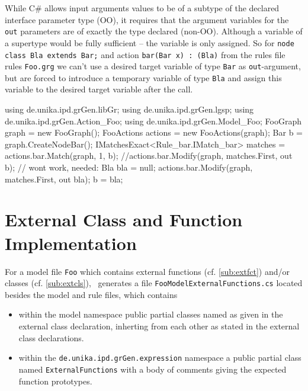 \begin{warning}
While C\# allows input arguments values to be of a subtype of the declared interface parameter type (OO), 
it requires that the argument variables for the \texttt{out} parameters are of exactly the type declared (non-OO).
Although a variable of a supertype would be fully sufficient -- the variable is only assigned.
So for \texttt{node class Bla extends Bar;} and action \texttt{bar(Bar x) : (Bla)} from the rules file rules \texttt{Foo.grg}
we can't use a desired target variable of type \texttt{Bar} as \texttt{out}-argument,
but are forced to introduce a temporary variable of type \texttt{Bla}
and assign this variable to the desired target variable after the call.
\begin{csharplet}
using de.unika.ipd.grGen.libGr;
using de.unika.ipd.grGen.lgsp;
using de.unika.ipd.grGen.Action_Foo;
using de.unika.ipd.grGen.Model_Foo;
FooGraph graph = new FooGraph();
FooActions actions = new FooActions(graph);
Bar b = graph.CreateNodeBar();
IMatchesExact<Rule_bar.IMatch_bar> matches = actions.bar.Match(graph, 1, b);
//actions.bar.Modify(graph, matches.First, out b); // wont work, needed:
Bla bla = null; 
actions.bar.Modify(graph, matches.First, out bla);
b = bla;
\end{csharplet}
\end{warning}


\section{External Class and Function Implementation}\label{sub:extclsfctimpl}

For a model file \texttt{Foo} which contains external functions (cf. \ref{sub:extfct}) and/or classes (cf. \ref{sub:extcls}), \GrG~generates a file \texttt{FooModelExternalFunctions.cs} located besides the model and rule files, which contains
\begin{itemize}
	\item within the model namespace public partial classes named as given in the external class declaration,
inherting from each other as stated in the external class declarations.
	\item within the \texttt{de.unika.ipd.grGen.expression} namespace a public partial class named \texttt{ExternalFunctions} with a body of comments giving the expected function prototypes.
\end{itemize}

